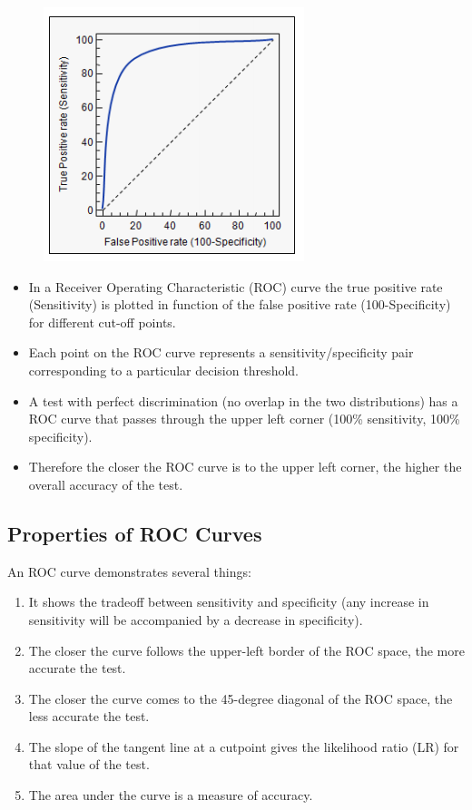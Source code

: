 \documentclass[a4paper,12pt]{article}
\begin{document}
\begin{figure}[h!]
	\centering
	\includegraphics[width=0.7\linewidth]{ROCcurve}
	\caption{}
	\label{fig:roccurve}
\end{figure}


\begin{itemize}
	\item In a Receiver Operating Characteristic (ROC) curve the true positive rate
	(Sensitivity) is plotted in function of the false positive rate (100-Specificity)
	for different cut-off points. 
	\item Each point on the ROC curve represents a sensitivity/specificity
	pair corresponding to a particular decision threshold. 
	\item A
	test with perfect discrimination (no overlap in the two distributions) has a
	ROC curve that passes through the upper left corner (100\% sensitivity, 100\%
	specificity). 
	\item Therefore the closer the ROC curve is to the upper left corner,
	the higher the overall accuracy of the test. %
\end{itemize}




\subsection*{Properties of ROC Curves}
An ROC curve demonstrates several things:
\begin{enumerate}
	\item It shows the tradeoff between sensitivity and specificity (any increase in sensitivity will be accompanied by a decrease in specificity).
	\item The closer the curve follows the upper-left border of the ROC space, the more accurate the test.
	\item The closer the curve comes to the 45-degree diagonal of the ROC space, the less accurate the test.
	\item The slope of the tangent line at a cutpoint gives the likelihood ratio (LR) for that value of the test.
	\item The area under the curve is a measure of accuracy.
\end{enumerate}
\end{document}
